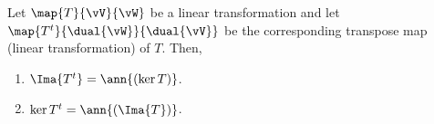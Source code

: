 \begin{Lemma}
    Let $\map{T}{\vV}{\vW}$ be a linear transformation and let $\map{T^{t}}{\dual{\vW}}{\dual{\vV}}$ be the
    corresponding transpose map (linear transformation) of $T$. Then,
    \begin{enumerate}
	\item
	    $\Ima{T^{t}} = \ann{(\ker{T})}$.
	\item
	    $\ker{T^{t}} = \ann{(\Ima{T})}$.
    \end{enumerate}
\end{Lemma}
\endinput

